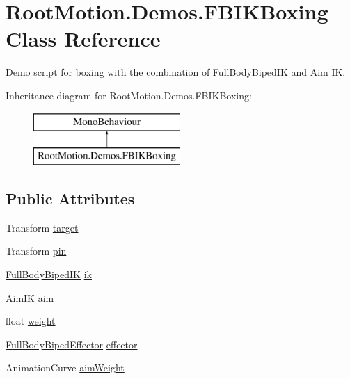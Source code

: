 \hypertarget{class_root_motion_1_1_demos_1_1_f_b_i_k_boxing}{}\section{Root\+Motion.\+Demos.\+F\+B\+I\+K\+Boxing Class Reference}
\label{class_root_motion_1_1_demos_1_1_f_b_i_k_boxing}


Demo script for boxing with the combination of Full\+Body\+Biped\+IK and Aim IK.  


Inheritance diagram for Root\+Motion.\+Demos.\+F\+B\+I\+K\+Boxing\+:\begin{figure}[H]
\begin{center}
\leavevmode
\includegraphics[height=2.000000cm]{class_root_motion_1_1_demos_1_1_f_b_i_k_boxing}
\end{center}
\end{figure}
\subsection*{Public Attributes}
\begin{DoxyCompactItemize}
\item 
Transform \mbox{\hyperlink{class_root_motion_1_1_demos_1_1_f_b_i_k_boxing_a4a78fc29fbe4b581dadb6d1b137c3fd3}{target}}
\item 
Transform \mbox{\hyperlink{class_root_motion_1_1_demos_1_1_f_b_i_k_boxing_ad0d78d31b398bf5f160f4ea7f71e8069}{pin}}
\item 
\mbox{\hyperlink{class_root_motion_1_1_final_i_k_1_1_full_body_biped_i_k}{Full\+Body\+Biped\+IK}} \mbox{\hyperlink{class_root_motion_1_1_demos_1_1_f_b_i_k_boxing_a7a99fcd737fa8f9a30b524da78857035}{ik}}
\item 
\mbox{\hyperlink{class_root_motion_1_1_final_i_k_1_1_aim_i_k}{Aim\+IK}} \mbox{\hyperlink{class_root_motion_1_1_demos_1_1_f_b_i_k_boxing_a97ca2ccc2dd1639ce108d4e01a47e31c}{aim}}
\item 
float \mbox{\hyperlink{class_root_motion_1_1_demos_1_1_f_b_i_k_boxing_a747ebe8c09a32f227e462c0bc373d13d}{weight}}
\item 
\mbox{\hyperlink{namespace_root_motion_1_1_final_i_k_ae0dd2058c7667b6f132c11a6b860c14a}{Full\+Body\+Biped\+Effector}} \mbox{\hyperlink{class_root_motion_1_1_demos_1_1_f_b_i_k_boxing_abce15c15d1a680933fdf2940359c5f8f}{effector}}
\item 
Animation\+Curve \mbox{\hyperlink{class_root_motion_1_1_demos_1_1_f_b_i_k_boxing_ac06543b5c7e2fd939444069eba07531d}{aim\+Weight}}
\end{DoxyCompactItemize}


